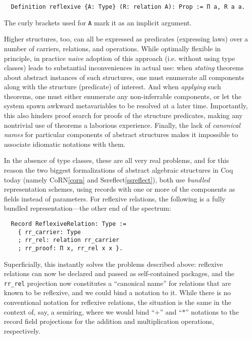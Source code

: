 \documentclass[a4paper,10pt,runningheads]{llncs}
\begin{document}
\begin{lstlisting}
  Definition reflexive {A: Type} (R: relation A): Prop := Π a, R a a.
\end{lstlisting}
The curly brackets used for \lstinline|A| mark it as an implicit argument.

Higher structures, too, can all be expressed as predicates (expressing laws) over a number of carriers, relations, and operations. While optimally flexible in principle, in practice \emph{naive} adoption of this approach (i.e. without using type classes) leads to substantial inconveniences in actual use: when \emph{stating} theorems about abstract instances of such structures, one must enumerate all components along with the structure (predicate) of interest. And when \emph{applying} such theorems, one must either enumerate any non-inferrable components, or let the system spawn awkward metavariables to be resolved at a later time. Importantly, this also hinders proof search for proofs of the structure predicates, making any nontrivial use of theorems a laborious experience. Finally, the lack of \emph{canonical names} for particular components of abstract structures makes it impossible to associate idiomatic notations with them.



In the absence of type classes, these are all very real problems, and for this reason the two biggest formalizations of abstract algebraic structures in Coq today (namely CoRN\ref{corn} and Ssreflect\ref{ssreflect}), both use \emph{bundled} representation schemes, using records with one or more of the components as fields instead of parameters. For reflexive relations, the following is a fully bundled representation---the other end of the spectrum:
\begin{lstlisting}
  Record ReflexiveRelation: Type :=
    { rr_carrier: Type
    ; rr_rel: relation rr_carrier
    ; rr_proof: Π x, rr_rel x x }.
\end{lstlisting}
Superficially, this instantly solves the problems described above: reflexive relations can now be declared and passed as self-contained packages, and the \lstinline|rr_rel| projection now constitutes a ``canonical name'' for relations that are known to be reflexive, and we could bind a notation to it. While there is no conventional notation for reflexive relations, the situation is the same in the context of, say, a semiring, where we would bind ``$+$'' and ``$*$'' notations to the record field projections for the addition and multiplication operations, respectively.
\end{document}
